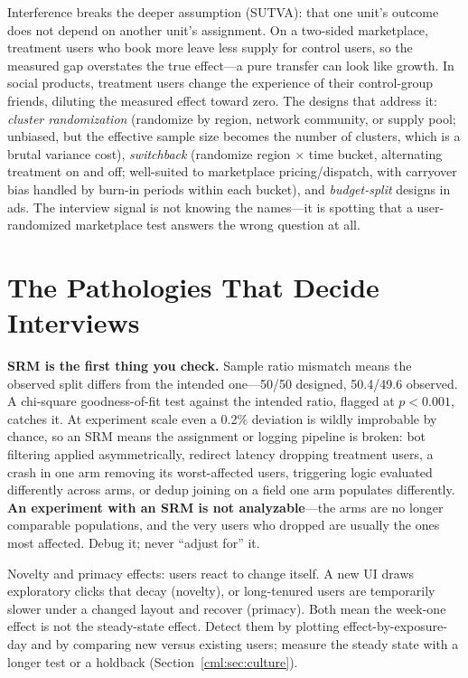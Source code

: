 Interference breaks the deeper assumption (SUTVA): that one unit's outcome does not depend on another unit's assignment. On a two-sided marketplace, treatment users who book more leave less supply for control users, so the measured gap overstates the true effect---a pure transfer can look like growth. In social products, treatment users change the experience of their control-group friends, diluting the measured effect toward zero. The designs that address it: \emph{cluster randomization} (randomize by region, network community, or supply pool; unbiased, but the effective sample size becomes the number of clusters, which is a brutal variance cost), \emph{switchback} (randomize region $\times$ time bucket, alternating treatment on and off; well-suited to marketplace pricing/dispatch, with carryover bias handled by burn-in periods within each bucket), and \emph{budget-split} designs in ads. The interview signal is not knowing the names---it is spotting that a user-randomized marketplace test answers the wrong question at all.

\section{The Pathologies That Decide Interviews}
\label{cml:sec:pathologies}

\begin{keyinsight}
\textbf{SRM is the first thing you check.} Sample ratio mismatch means the observed split differs from the intended one---50/50 designed, 50.4/49.6 observed. A chi-square goodness-of-fit test against the intended ratio, flagged at $p < 0.001$, catches it. At experiment scale even a 0.2\% deviation is wildly improbable by chance, so an SRM means the assignment or logging pipeline is broken: bot filtering applied asymmetrically, redirect latency dropping treatment users, a crash in one arm removing its worst-affected users, triggering logic evaluated differently across arms, or dedup joining on a field one arm populates differently. \textbf{An experiment with an SRM is not analyzable}---the arms are no longer comparable populations, and the very users who dropped are usually the ones most affected. Debug it; never ``adjust for'' it.
\end{keyinsight}

Novelty and primacy effects: users react to change itself. A new UI draws exploratory clicks that decay (novelty), or long-tenured users are temporarily slower under a changed layout and recover (primacy). Both mean the week-one effect is not the steady-state effect. Detect them by plotting effect-by-exposure-day and by comparing new versus existing users; measure the steady state with a longer test or a holdback (Section~\ref{cml:sec:culture}).

